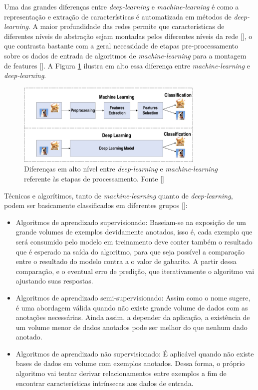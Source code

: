 Uma das grandes diferenças entre \textit{deep-learning} e \textit{machine-learning} é como a representação e extração de características é automatizada em métodos de \textit{deep-learning}. A maior profundidade das redes permite que características de diferentes níveis de abstração sejam montadas pelos diferentes níveis da rede [], o que contrasta bastante com a geral necessidade de etapas pre-processamento sobre os dados de entrada de algoritmos de \textit{machine-learning} para a montagem de features []. A Figura \ref{fig:dl_vs_ml} ilustra em alto essa diferença entre \textit{machine-learning} e \textit{deep-learning}.

\begin{figure}
    \centering
    \includegraphics[width=0.8\textwidth]{figs/theory-ml-vs-dl.png}
    \caption{Diferenças em alto nível entre \textit{deep-learning} e \textit{machine-learning} referente às etapas de processamento. Fonte []}
    \label{fig:dl_vs_ml}
\end{figure}

Técnicas e algorítimos, tanto de \textit{machine-learning} quanto de \textit{deep-learning}, podem ser basicamente classificados em diferentes grupos []:
\begin{itemize}
    \item Algoritmos de aprendizado supervisionado: Baseiam-se na exposição de um grande volumes de exemplos devidamente anotados, isso é, cada exemplo que será consumido pelo modelo em treinamento deve conter também o resultado que é esperado na saída do algoritmo, para que seja possível a comparação entre o resultado do modelo contra a o valor de gabarito. A partir dessa comparação, e o eventual erro de predição, que iterativamente o algoritmo vai ajustando suas respostas.
    \item Algoritmos de aprendizado semi-supervisionado: Assim como o nome sugere, é uma abordagem válida quando não existe grande volume de dados com as anotações necessárias. Ainda assim, a depender da aplicação, a existência de um volume menor de dados anotados pode ser melhor do que nenhum dado anotado.
    \item Algoritmos de aprendizado não supervisionado: É aplicável quando não existe bases de dados em volume com exemplos anotados. Dessa forma, o próprio algoritmo vai tentar derivar relacionamentos entre exemplos a fim de encontrar características intrínsecas aos dados de entrada.
\end{itemize}


